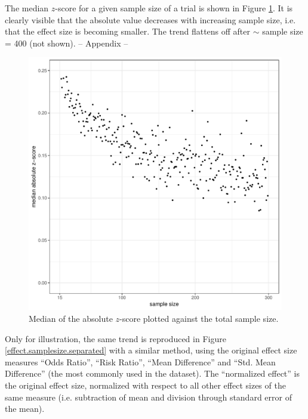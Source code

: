 \documentclass[11pt,a4paper,twoside]{book}\usepackage[]{graphicx}\usepackage[]{color}
\makeatletter
\def\maxwidth{ %
  \ifdim\Gin@nat@width>\linewidth
    \linewidth
  \else
    \Gin@nat@width
  \fi
}
\newenvironment{knitrout}{}{} %
\makeatother
\begin{document}
The median $z$-score for a given sample size of a trial is shown in Figure \ref{z.samplesize}. It is clearly visible that the absolute value decreases with increasing sample size, i.e. that the effect size is becoming smaller. The trend flattens off after $\sim$ sample size = 400 (not shown). 
-- Appendix --

\begin{figure}
\begin{knitrout}
\color{fgcolor}
\includegraphics[width=\maxwidth]{figure/unnamed-chunk-10-1} 

\end{knitrout}
\caption{Median of the absolute $z$-score plotted against the total sample size.}
\label{z.samplesize}
\end{figure}

Only for illustration, the same trend is reproduced in Figure \ref{effect.samplesize.separated} with a similar method, using the original effect size measures ``Odds Ratio'', ``Risk Ratio'', ``Mean Difference'' and ``Std. Mean Difference'' (the most commonly used in the dataset). The ``normalized effect'' is the original effect size, normalized with respect to all other effect sizes of the same measure (i.e. subtraction of mean and division through standard error of the mean).
\end{document}
